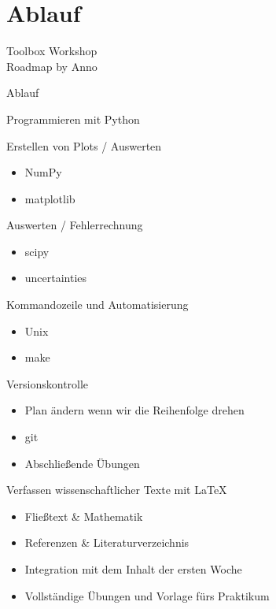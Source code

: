 \section{Ablauf}

\begin{frame}
    \begin{center}
        \Huge Toolbox Workshop \\
        Roadmap by Anno
    \end{center}
\end{frame}

\begin{frame}{Ablauf}
  \begin{description}
    \item[Montag] Programmieren mit Python
    \item[Dienstag] Erstellen von Plots / Auswerten
      \begin{itemize}
        \item NumPy
        \item matplotlib
      \end{itemize}
    \item[Mittwoch] Auswerten / Fehlerrechnung
      \begin{itemize}
        \item scipy
        \item uncertainties
      \end{itemize}
    \item[Donnerstag] Kommandozeile und Automatisierung
      \begin{itemize}
        \item Unix
        \item make
      \end{itemize}
    \item[Freitag] Versionskontrolle
      \begin{itemize}
        \item {\huge Plan ändern wenn wir die Reihenfolge drehen}
        \item git
        \item Abschließende Übungen
      \end{itemize}
    \item[Nächste Woche] Verfassen wissenschaftlicher Texte mit \LaTeX{}
      \begin{itemize}
        \item Fließtext \& Mathematik
        \item Referenzen \& Literaturverzeichnis
        \item Integration mit dem Inhalt der ersten Woche
        \item Vollständige Übungen und Vorlage fürs Praktikum
      \end{itemize}
  \end{description}
\end{frame}